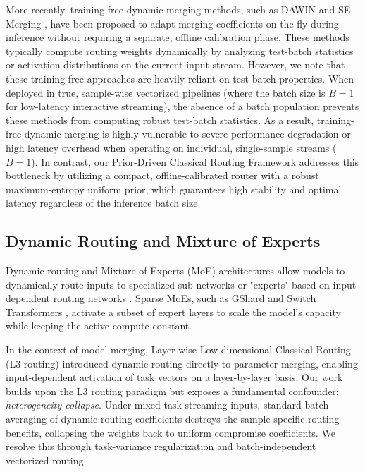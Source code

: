 More recently, training-free dynamic merging methods, such as DAWIN \cite{dawin2024} and SE-Merging \cite{semerging2025}, have been proposed to adapt merging coefficients on-the-fly during inference without requiring a separate, offline calibration phase. These methods typically compute routing weights dynamically by analyzing test-batch statistics or activation distributions on the current input stream. However, we note that these training-free approaches are heavily reliant on test-batch properties. When deployed in true, sample-wise vectorized pipelines (where the batch size is $B=1$ for low-latency interactive streaming), the absence of a batch population prevents these methods from computing robust test-batch statistics. As a result, training-free dynamic merging is highly vulnerable to severe performance degradation or high latency overhead when operating on individual, single-sample streams ($B=1$). In contrast, our Prior-Driven Classical Routing Framework addresses this bottleneck by utilizing a compact, offline-calibrated router with a robust maximum-entropy uniform prior, which guarantees high stability and optimal latency regardless of the inference batch size.

\subsection{Dynamic Routing and Mixture of Experts}
Dynamic routing and Mixture of Experts (MoE) architectures allow models to dynamically route inputs to specialized sub-networks or "experts" based on input-dependent routing networks \cite{shazeer2017outrageously}. Sparse MoEs, such as GShard \cite{lepikhin2020gshard} and Switch Transformers \cite{fedus2022switch}, activate a subset of expert layers to scale the model's capacity while keeping the active compute constant. 

In the context of model merging, Layer-wise Low-dimensional Classical Routing (L3 routing) \cite{muqeeth2023l3} introduced dynamic routing directly to parameter merging, enabling input-dependent activation of task vectors on a layer-by-layer basis. Our work builds upon the L3 routing paradigm but exposes a fundamental confounder: \emph{heterogeneity collapse}. Under mixed-task streaming inputs, standard batch-averaging of dynamic routing coefficients destroys the sample-specific routing benefits, collapsing the weights back to uniform compromise coefficients. We resolve this through task-variance regularization and batch-independent vectorized routing.

